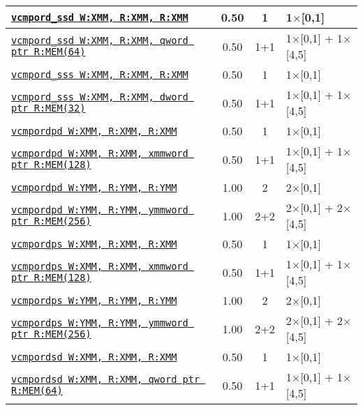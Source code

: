\documentclass[a4paper,english,fontsize=9]{scrartcl}
\begin{document}
\begin{longtable}{p{}ccL{.25\textwidth}}
  \midrule
  \texttt{\href{https://felixcloutier.com/x86/CMPSD.html}{vcmpord\_ssd W:XMM, R:XMM, R:XMM}} & 0.50 & 1 & 1\(\times\)[0,1] \\
  \midrule
  \texttt{\href{https://felixcloutier.com/x86/CMPSD.html}{vcmpord\_ssd W:XMM, R:XMM, qword ptr R:MEM(64)}} & 0.50 & 1+1 & 1\(\times\)[0,1] + 1\(\times\)[4,5] \\
  \midrule
  \texttt{\href{https://felixcloutier.com/x86/CMPSS.html}{vcmpord\_sss W:XMM, R:XMM, R:XMM}} & 0.50 & 1 & 1\(\times\)[0,1] \\
  \midrule
  \texttt{\href{https://felixcloutier.com/x86/CMPSS.html}{vcmpord\_sss W:XMM, R:XMM, dword ptr R:MEM(32)}} & 0.50 & 1+1 & 1\(\times\)[0,1] + 1\(\times\)[4,5] \\
  \midrule
  \texttt{\href{https://felixcloutier.com/x86/CMPPD.html}{vcmpordpd W:XMM, R:XMM, R:XMM}} & 0.50 & 1 & 1\(\times\)[0,1] \\
  \midrule
  \texttt{\href{https://felixcloutier.com/x86/CMPPD.html}{vcmpordpd W:XMM, R:XMM, xmmword ptr R:MEM(128)}} & 0.50 & 1+1 & 1\(\times\)[0,1] + 1\(\times\)[4,5] \\
  \midrule
  \texttt{\href{https://felixcloutier.com/x86/CMPPD.html}{vcmpordpd W:YMM, R:YMM, R:YMM}} & 1.00 & 2 & 2\(\times\)[0,1] \\
  \midrule
  \texttt{\href{https://felixcloutier.com/x86/CMPPD.html}{vcmpordpd W:YMM, R:YMM, ymmword ptr R:MEM(256)}} & 1.00 & 2+2 & 2\(\times\)[0,1] + 2\(\times\)[4,5] \\
  \midrule
  \texttt{\href{https://felixcloutier.com/x86/CMPPS.html}{vcmpordps W:XMM, R:XMM, R:XMM}} & 0.50 & 1 & 1\(\times\)[0,1] \\
  \midrule
  \texttt{\href{https://felixcloutier.com/x86/CMPPS.html}{vcmpordps W:XMM, R:XMM, xmmword ptr R:MEM(128)}} & 0.50 & 1+1 & 1\(\times\)[0,1] + 1\(\times\)[4,5] \\
  \midrule
  \texttt{\href{https://felixcloutier.com/x86/CMPPS.html}{vcmpordps W:YMM, R:YMM, R:YMM}} & 1.00 & 2 & 2\(\times\)[0,1] \\
  \midrule
  \texttt{\href{https://felixcloutier.com/x86/CMPPS.html}{vcmpordps W:YMM, R:YMM, ymmword ptr R:MEM(256)}} & 1.00 & 2+2 & 2\(\times\)[0,1] + 2\(\times\)[4,5] \\
  \midrule
  \texttt{\href{https://felixcloutier.com/x86/CMPSD.html}{vcmpordsd W:XMM, R:XMM, R:XMM}} & 0.50 & 1 & 1\(\times\)[0,1] \\
  \midrule
  \texttt{\href{https://felixcloutier.com/x86/CMPSD.html}{vcmpordsd W:XMM, R:XMM, qword ptr R:MEM(64)}} & 0.50 & 1+1 & 1\(\times\)[0,1] + 1\(\times\)[4,5] \\

\end{longtable}
\end{document}
